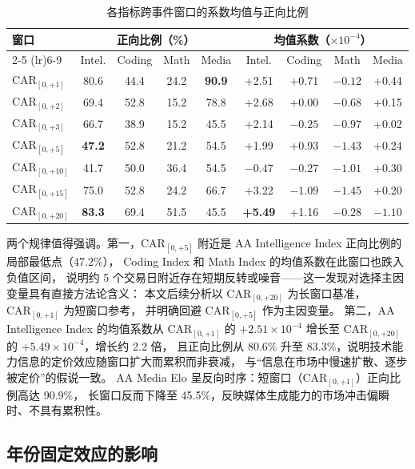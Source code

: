 \documentclass[11pt,fontset=fandol,a4paper]{ctexart}
\begin{document}
\begin{table}[htbp]
\centering
\caption{各指标跨事件窗口的系数均值与正向比例}
\label{tab:specr_window}
\small
\begin{tabular}{lcccc|cccc}
\toprule
\multirow{2}{*}{窗口} & \multicolumn{4}{c|}{正向比例（\%）} & \multicolumn{4}{c}{均值系数（$\times10^{-4}$）} \\
\cmidrule(lr){2-5} \cmidrule(lr){6-9}
 & Intel. & Coding & Math & Media & Intel. & Coding & Math & Media \\
\midrule
$\text{CAR}_{[0,+1]}$  & 80.6 & 44.4 & 24.2 & \textbf{90.9} & +2.51 & +0.71 & $-0.12$ & +0.44 \\
$\text{CAR}_{[0,+2]}$  & 69.4 & 52.8 & 15.2 & 78.8          & +2.68 & +0.00 & $-0.68$ & +0.15 \\
$\text{CAR}_{[0,+3]}$  & 66.7 & 38.9 & 15.2 & 45.5          & +2.14 & $-0.25$ & $-0.97$ & +0.02 \\
$\text{CAR}_{[0,+5]}$  & \textbf{47.2} & 52.8 & 21.2 & 54.5          & +1.99 & +0.93 & \textbf{$-1.43$} & +0.24 \\
$\text{CAR}_{[0,+10]}$ & 41.7 & 50.0 & 36.4 & 54.5          & $-0.47$ & $-0.27$ & $-1.01$ & +0.30 \\
$\text{CAR}_{[0,+15]}$ & 75.0 & 52.8 & 24.2 & 66.7          & +3.22 & $-1.09$ & $-1.45$ & +0.20 \\
$\text{CAR}_{[0,+20]}$ & \textbf{83.3} & 69.4 & 51.5 & 45.5          & \textbf{+5.49} & +1.16 & $-0.28$ & $-1.10$ \\
\bottomrule
\end{tabular}
\end{table}

两个规律值得强调。第一，$\text{CAR}_{[0,+5]}$ 附近是 AA Intelligence Index 正向比例的局部最低点（47.2\%），
Coding Index 和 Math Index 的均值系数在此窗口也跌入负值区间，
说明约 5 个交易日附近存在短期反转或噪音——这一发现对选择主因变量具有直接方法论含义：
本文后续分析以 $\text{CAR}_{[0,+20]}$ 为长窗口基准，$\text{CAR}_{[0,+1]}$ 为短窗口参考，
并明确回避 $\text{CAR}_{[0,+5]}$ 作为主因变量。
第二，AA Intelligence Index 的均值系数从 $\text{CAR}_{[0,+1]}$ 的 $+2.51\times10^{-4}$
增长至 $\text{CAR}_{[0,+20]}$ 的 $+5.49\times10^{-4}$，增长约 2.2 倍，
且正向比例从 80.6\% 升至 83.3\%，说明技术能力信息的定价效应随窗口扩大而累积而非衰减，
与``信息在市场中慢速扩散、逐步被定价''的假说一致。
AA Media Elo 呈反向时序：短窗口（$\text{CAR}_{[0,+1]}$）正向比例高达 90.9\%，
长窗口反而下降至 45.5\%，反映媒体生成能力的市场冲击偏瞬时、不具有累积性。

\subsection{年份固定效应的影响}
\end{document}
